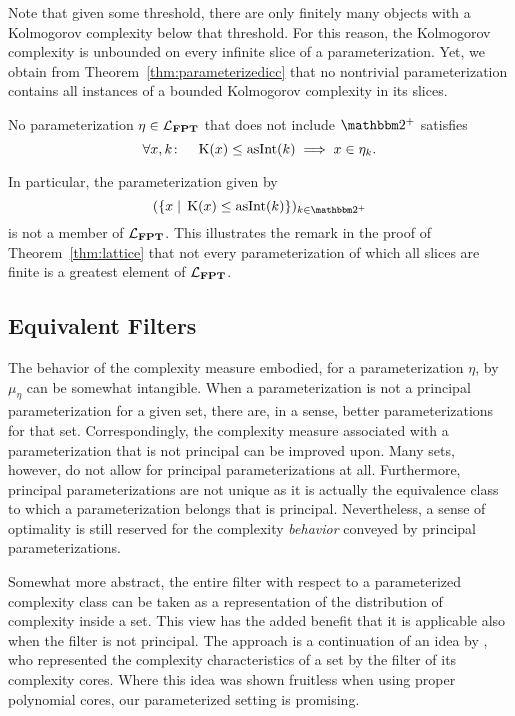 Note that given some threshold, there are only finitely many objects with a Kolmogorov complexity below that threshold.
For this reason, the Kolmogorov complexity is unbounded on every infinite slice of a parameterization.
Yet, we obtain from Theorem~\ref{thm:parameterizedicc} that no nontrivial parameterization contains all instances of a bounded Kolmogorov complexity in its slices.
\begin{corollary}
  No parameterization $\eta \in \mathcal{L}_{\textnormal{\textbf{FPT}}}$ that does not include $\binary^+$ satisfies
  \begin{equation*}
    \forall x, k\colon\quad\operatorname{K}(x) \le \operatorname{asInt}(k) \implies x \in \eta_k.
  \end{equation*}
\end{corollary}

In particular, the parameterization given by
\begin{equation}
\label{eq:kcparameterization}
  (\{x \st \KC(x) \le \asNat(k)\})_{k \in \binary^+}
\end{equation}
is not a member of $\mathcal{L}_{\textnormal{\textbf{FPT}}}$.
This illustrates the remark in the proof of Theorem~\ref{thm:lattice} that not every parameterization of which all slices are finite is a greatest element of $\mathcal{L}_{\textnormal{\textbf{FPT}}}$.

\subsection{Equivalent Filters}
The behavior of the complexity measure embodied, for a parameterization $\eta$, by $\mu_\eta$ can be somewhat intangible.
When a parameterization is not a principal parameterization for a given set, there are, in a sense, better parameterizations for that set.
Correspondingly, the complexity measure associated with a parameterization that is not principal can be improved upon.
Many sets, however, do not allow for principal parameterizations at all.
Furthermore, principal parameterizations are not unique as it is actually the equivalence class to which a parameterization belongs that is principal.
Nevertheless, a sense of optimality is still reserved for the complexity \emph{behavior} conveyed by principal parameterizations.

Somewhat more abstract, the entire filter with respect to a parameterized complexity class can be taken as a representation of the distribution of complexity inside a set.
This view has the added benefit that it is applicable also when the filter is not principal.
The approach is a continuation of an idea by \textcite{orponen1986classification}, who represented the complexity characteristics of a set by the filter of its complexity cores.
Where this idea was shown fruitless when using proper polynomial cores, our parameterized setting is promising.

